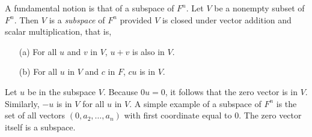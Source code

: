 A fundamental notion \cite{yao2002can} is that of a subspace of $F^n$. Let $V$ be a nonempty subset of
$F^n$. Then $V$ is a {\it subspace} of $F^n$ provided $V$ is closed
under vector addition and scalar multiplication, that is,
\begin{enumerate}
\item[\rm (a)] For all $u$ and $v$ in $V$, $u+v$ is
also in $V$.
\item[\rm (b)] For all $u$ in $V$ and $c$ in $F$, $cu$ is
in $V$.
\end{enumerate}
Let $u$ be in the subspace $V$. Because $0u=0$,
it follows that the zero vector is in $V$. Similarly, $-u$ is in $V$
for all $u$ in $V$. A simple example of a subspace of $F^n$ is the set
of all vectors $(0,a_2,\ldots,a_n)$ with first coordinate equal to 0.
The zero vector itself is a subspace.

